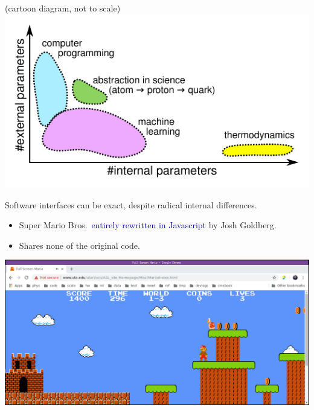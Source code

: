 \documentclass[aspectratio=169]{beamer}
\begin{document}
\begin{frame}{(cartoon diagram, not to scale)}
\vspace{0.2 cm}
\includegraphics[width=\linewidth]{internal-vs-external.pdf}
\end{frame}

\begin{frame}{Software interfaces can be exact, despite radical internal differences.}
\large
\vspace{0.13 cm}
\begin{itemize}
\item Super Mario Bros.\ \textcolor{darkblue}{entirely rewritten in Javascript} by Josh Goldberg.
\item Shares none of the original code.
\end{itemize}

\begin{center}
\includegraphics[width=0.97\linewidth]{supermario-javascript.png}
\end{center}

\vspace{-1.8 cm}\mbox{ }\hfill{}\hfill\mbox{ }

\vspace{1.8 cm}
\end{frame}
\end{document}
